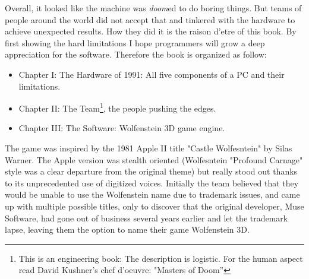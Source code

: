 Overall, it looked like the machine was \emph{doom}ed to do boring things. But teams of people around the world did not accept that and tinkered with the hardware to achieve unexpected results. How they did it is the raison d'etre of this book. By first showing the hard limitations I hope programmers will grow a deep appreciation for the software. Therefore the book is organized as follow:
\begin{itemize}
\item Chapter I: The Hardware of 1991: All five components of a PC and their limitations.
\item Chapter II: The Team\footnote{This is an engineering book: The description is logistic. For the human aspect read David Kushner's chef d'oeuvre: "Masters of Doom''}, the people pushing the edges.
\item Chapter III: The Software: Wolfenstein 3D game engine.
\end{itemize}
\par
{} The game was inspired by the 1981 Apple II title "Castle Wolfesntein" by Silas Warner. The Apple version was stealth oriented (Wolfesntein "Profound Carnage" style was a clear departure from the original theme) but really stood out thanks to its unprecedented use of digitized voices. Initially the team believed that they would be unable to use the Wolfenstein name due to trademark issues, and came up with multiple possible titles, only to discover that the original developer, Muse Software, had gone out of business several years earlier and let the trademark lapse, leaving them the option to name their game Wolfenstein 3D.

\begin{figure}[H]
\centering
{}
\end{figure}
